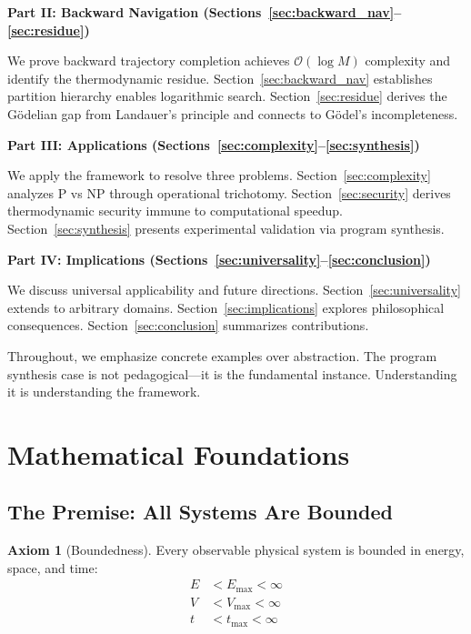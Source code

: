 \documentclass[twocolumn,10pt]{article}
\theoremstyle{definition}
\newtheorem{axiom}[theorem]{Axiom}
\theoremstyle{remark}
\newcommand{\bigO}{\mathcal{O}}
\begin{document}
\vspace{0.2cm}
\noindent\textbf{Part II: Backward Navigation (Sections~\ref{sec:backward_nav}--\ref{sec:residue})}

We prove backward trajectory completion achieves $\bigO(\log M)$ complexity and identify the thermodynamic residue. Section~\ref{sec:backward_nav} establishes partition hierarchy enables logarithmic search. Section~\ref{sec:residue} derives the Gödelian gap from Landauer's principle and connects to Gödel's incompleteness\cite{godel1931}.

\vspace{0.2cm}
\noindent\textbf{Part III: Applications (Sections~\ref{sec:complexity}--\ref{sec:synthesis})}

We apply the framework to resolve three problems. Section~\ref{sec:complexity} analyzes P vs NP through operational trichotomy. Section~\ref{sec:security} derives thermodynamic security immune to computational speedup. Section~\ref{sec:synthesis} presents experimental validation via program synthesis.

\vspace{0.2cm}
\noindent\textbf{Part IV: Implications (Sections~\ref{sec:universality}--\ref{sec:conclusion})}

We discuss universal applicability and future directions. Section~\ref{sec:universality} extends to arbitrary domains. Section~\ref{sec:implications} explores philosophical consequences. Section~\ref{sec:conclusion} summarizes contributions.

\vspace{0.2cm}
\noindent Throughout, we emphasize concrete examples over abstraction. The program synthesis case is not pedagogical—it is the fundamental instance. Understanding it is understanding the framework.

\section{Mathematical Foundations}
\label{sec:foundations}

\subsection{The Premise: All Systems Are Bounded}

\begin{axiom}[Boundedness]
\label{ax:bounded}
Every observable physical system is bounded in energy, space, and time:
\begin{align}
E &< E_{\max} < \infty \\
V &< V_{\max} < \infty \\
t &< t_{\max} < \infty
\end{align}
\end{axiom}
\end{document}

